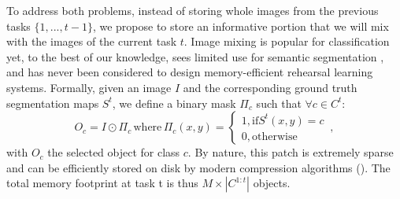 To address both problems, instead of storing whole images from the previous tasks $\{1, ..., t-1\}$,
we propose to store an informative portion that we will mix with the images of the current task $t$.
Image mixing is popular for classification
\cite{hingyi2018mixup,yun2019cutmix,dabouei2020supermix,verma2019manifoldmixup,li2021moex,rame2021mixmo}
yet, to the best of our knowledge, sees limited use for semantic segmentation
\cite{fang2019instaboost,olsson2021classmix,zhang2021objectaug,tranheden2021dacs,ghiasi2020simplecopypaste},
and has never been considered to design memory-efficient rehearsal learning systems. Formally, given
an image $I$ and the corresponding ground truth segmentation maps $S^t$, we define a binary mask
$\Pi_c$  such that $\forall c \in C^t$:
%
\begin{equation}
    O_c = I \odot \Pi_c\,\text{where}\,\Pi_c(x, y) = \left\{\begin{array}{l}
        1, \text{if} S^t(x, y) = c \\
        0, \text{otherwise}
    \end{array}\right.\,,
    \label{eq:seg_mask_object}
\end{equation}
%
\noindent with $O_c$ the selected object for class $c$. By nature, this patch is extremely sparse
and can be efficiently stored on disk by modern compression algorithms (\cite{ISO)10918}). The total
memory footprint at task t is thus $M \times |C^{1:t}|$ objects.

